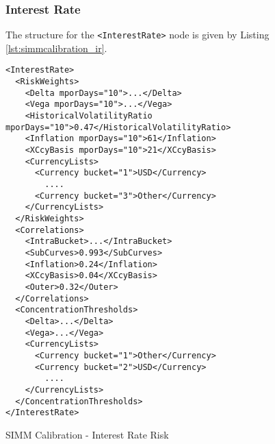 \subsubsection{Interest Rate}
The structure for the {\tt <InterestRate>} node is given by Listing \ref{lst:simmcalibration_ir}.

\begin{listing}[H]
\begin{verbatim}
<InterestRate>
  <RiskWeights>
    <Delta mporDays="10">...</Delta>
    <Vega mporDays="10">...</Vega>
    <HistoricalVolatilityRatio mporDays="10">0.47</HistoricalVolatilityRatio>
    <Inflation mporDays="10">61</Inflation>
    <XCcyBasis mporDays="10">21</XCcyBasis>
    <CurrencyLists>
      <Currency bucket="1">USD</Currency>
        ....
      <Currency bucket="3">Other</Currency>
    </CurrencyLists>
  </RiskWeights>
  <Correlations>
    <IntraBucket>...</IntraBucket>
    <SubCurves>0.993</SubCurves>
    <Inflation>0.24</Inflation>
    <XCcyBasis>0.04</XCcyBasis>
    <Outer>0.32</Outer>
  </Correlations>
  <ConcentrationThresholds>
    <Delta>...</Delta>
    <Vega>...</Vega>
    <CurrencyLists>
      <Currency bucket="1">Other</Currency>
      <Currency bucket="2">USD</Currency>
        ....
    </CurrencyLists>
  </ConcentrationThresholds>
</InterestRate>
\end{verbatim}
\caption{SIMM Calibration - Interest Rate Risk}
\label{lst:simmcalibration_ir}
\end{listing}

